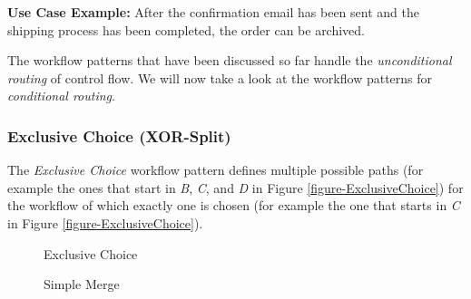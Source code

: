 \textbf{Use Case Example:} After the confirmation email has been sent and
the shipping process has been completed, the order can be archived.

The workflow patterns that have been discussed so far handle the
\emph{unconditional routing} of control flow. We will now take a look at the
workflow patterns for \emph{conditional routing}.

\subsubsection{Exclusive Choice (XOR-Split)}

The \emph{Exclusive Choice} workflow pattern defines multiple possible paths
(for example the ones that start in \emph{B}, \emph{C}, and \emph{D} in Figure
\ref{figure-ExclusiveChoice}) for the workflow of which exactly one is chosen
(for example the one that starts in \emph{C} in Figure
\ref{figure-ExclusiveChoice}).

\begin{figure}[htb]
  \begin{minipage}{0.45\textwidth}
    \begin{center}
      \caption[The \emph{Exclusive Choice} workflow pattern]{Exclusive Choice}
      \label{figure-ExclusiveChoice}
    \end{center}
  \end{minipage}
  \hfill
  \begin{minipage}{0.45\textwidth}
    \begin{center}
      \caption[The \emph{Simple Merge} workflow pattern]{Simple Merge}
      \label{figure-SimpleMerge}
    \end{center}
  \end{minipage}
\end{figure}

